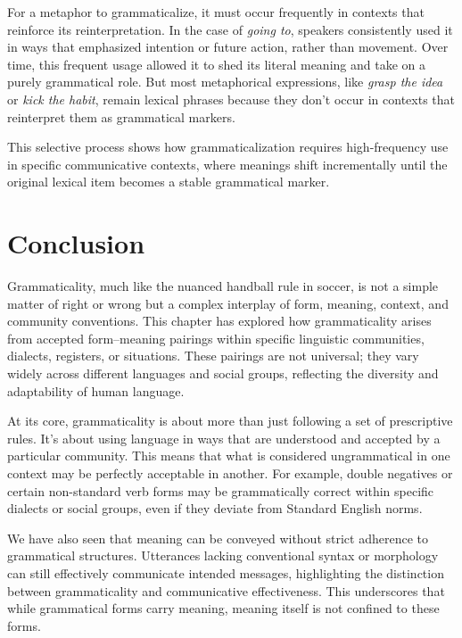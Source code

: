 For a metaphor to grammaticalize, it must occur frequently in contexts that reinforce its reinterpretation. In the case of \textit{going to}, speakers consistently used it in ways that emphasized intention or future action, rather than movement. Over time, this frequent usage allowed it to shed its literal meaning and take on a purely grammatical role. But most metaphorical expressions, like \textit{grasp the idea} or \textit{kick the habit}, remain lexical phrases because they don't occur in contexts that reinterpret them as grammatical markers. 

This selective process shows how grammaticalization requires high-frequency use in specific communicative contexts, where meanings shift incrementally until the original lexical item becomes a stable grammatical marker.

\section{Conclusion}

Grammaticality, much like the nuanced handball rule in soccer, is not a simple matter of right or wrong but a complex interplay of form, meaning, context, and community conventions. This chapter has explored how grammaticality arises from accepted form–meaning pairings within specific linguistic communities, dialects, registers, or situations. These pairings are not universal; they vary widely across different languages and social groups, reflecting the diversity and adaptability of human language.

At its core, grammaticality is about more than just following a set of prescriptive rules. It's about using language in ways that are understood and accepted by a particular community. This means that what is considered ungrammatical in one context may be perfectly acceptable in another. For example, double negatives or certain non-standard verb forms may be grammatically correct within specific dialects or social groups, even if they deviate from Standard English norms.

We have also seen that meaning can be conveyed without strict adherence to grammatical structures. Utterances lacking conventional syntax or morphology can still effectively communicate intended messages, highlighting the distinction between grammaticality and communicative effectiveness. This underscores that while grammatical forms carry meaning, meaning itself is not confined to these forms.

